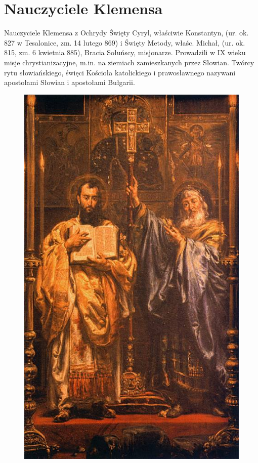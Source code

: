 \documentclass{beamer}
\begin{document}
\section{Nauczyciele Klemensa}
\begin{frame}{Nauczyciele Klemensa z Ochrydy}
Święty Cyryl, właściwie Konstantyn, (ur. ok. 827 w Tesalonice, zm. 14 lutego 869) i Święty Metody, właśc. Michał, (ur. ok. 815, zm. 6 kwietnia 885), Bracia Sołuńscy, misjonarze. Prowadzili w IX wieku misje chrystianizacyjne, m.in. na ziemiach zamieszkanych przez Słowian. Twórcy rytu słowiańskiego, święci Kościoła katolickiego i prawosławnego nazywani apostołami Słowian  i apostołami Bułgarii.
\begin{figure}
\includegraphics[scale=0.6]{Cyril_and_Methodius.jpg}
\end{figure}
\end{frame}
\end{document}
